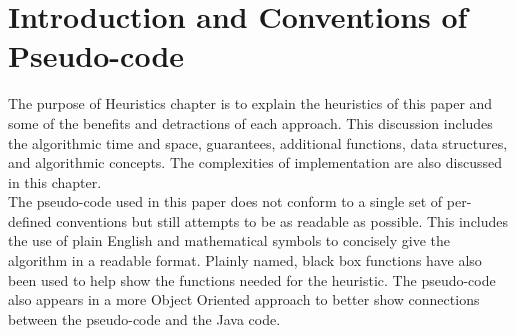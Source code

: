 \documentclass[midd]{thesis}
\newcommand{\tab}{\hspace*{2em}}
\begin{document}
\section{Introduction and Conventions of Pseudo-code}
\tab The purpose of Heuristics chapter is to explain the heuristics of this paper and some of the benefits and detractions of each approach. This discussion includes the algorithmic time and space, guarantees,  additional functions, data structures, and algorithmic concepts. The complexities of implementation are also discussed in this chapter.\\
\tab The pseudo-code used in this paper does not conform to a single set of per-defined conventions but  still attempts to be as readable as possible. This includes the use of plain English and mathematical symbols to concisely give the algorithm in a readable format. Plainly named, black box functions have also been used to help show the functions needed for the heuristic. The pseudo-code also appears in a more Object Oriented approach to better show connections between the pseudo-code and the Java code.
\end{document}
